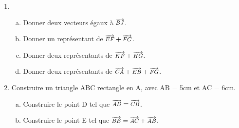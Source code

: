 \documentclass{beamer}
\newcommand\scalemath[2]{\scalebox{#1}{\mbox{\ensuremath{\displaystyle #2}}}}
\renewcommand{\widevec}[1]{\scalemath{0.85}{\overrightarrow{#1}}}
\begin{document}
\begin{frame}
\begin{multicols}{2}
\begin{center}
		\end{center}
		\begin{enumerate}
			\item \begin{enumerate}[a.]
				      \item Donner deux vecteurs égaux à $\widevec{BJ}$.
				      \item Donner un représentant de $\widevec{EF} + \widevec{FG}$.
				      \item Donner deux représentants de $\widevec{KF} + \widevec{HG}$.
				      \item Donner deux représentants de $\widevec{CA} + \widevec{EB} + \widevec{FG}$.
			      \end{enumerate}
			\item Construire un triangle ABC rectangle en A, avec AB = 5cm et AC = 6cm.
			      \begin{enumerate}[a.]
				      \item Construire le point D tel que $\widevec{AD} = \widevec{CB}$.
				      \item Construire le point E tel que $\widevec{BE} = \widevec{AC} + \widevec{AB}$.
			      \end{enumerate}
		\end{enumerate}
	\end{multicols}
\end{frame}
\end{document}
